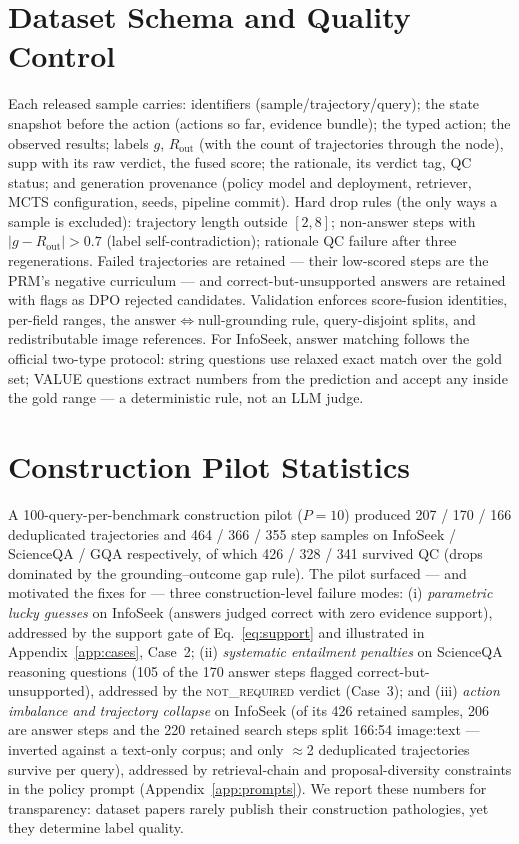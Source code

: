\documentclass[letterpaper,twocolumn,10pt]{article}
\begin{document}
\section{Dataset Schema and Quality Control}
\label{app:dataset}
Each released sample carries: identifiers (sample/trajectory/query); the
state snapshot before the action (actions so far, evidence bundle); the
typed action; the observed results; labels $g$, $R_\mathrm{out}$ (with the
count of trajectories through the node), $\mathrm{supp}$ with its raw
verdict, the fused score; the rationale, its verdict tag, QC status; and
generation provenance (policy model and deployment, retriever, MCTS
configuration, seeds, pipeline commit). Hard drop rules (the only ways a
sample is excluded): trajectory length outside $[2, 8]$; non-answer steps
with $|g - R_\mathrm{out}| > 0.7$ (label self-contradiction); rationale QC
failure after three regenerations. Failed trajectories are retained ---
their low-scored steps are the PRM's negative curriculum --- and
correct-but-unsupported answers are retained with flags as DPO rejected
candidates. Validation enforces score-fusion identities, per-field ranges,
the answer$\Leftrightarrow$null-grounding rule, query-disjoint splits, and
redistributable image references. For InfoSeek, answer matching follows
the official two-type protocol: string questions use relaxed exact match
over the gold set; VALUE questions extract numbers from the prediction and
accept any inside the gold range --- a deterministic rule, not an LLM
judge.

\section{Construction Pilot Statistics}
\label{app:pilot}
A 100-query-per-benchmark construction pilot ($P{=}10$) produced 207 / 170
/ 166 deduplicated trajectories and 464 / 366 / 355 step samples on
InfoSeek / ScienceQA / GQA respectively, of which 426 / 328 / 341 survived
QC (drops dominated by the grounding--outcome gap rule). The pilot
surfaced --- and motivated the fixes for --- three construction-level
failure modes: (i) \emph{parametric lucky guesses} on InfoSeek (answers
judged correct with zero evidence support), addressed by the support gate
of Eq.~\eqref{eq:support} and illustrated in Appendix~\ref{app:cases},
Case~2; (ii) \emph{systematic entailment penalties} on ScienceQA reasoning
questions (105 of the 170 answer steps flagged correct-but-unsupported),
addressed by the \textsc{not\_required} verdict (Case~3); and (iii)
\emph{action imbalance and trajectory collapse} on InfoSeek (of its 426
retained samples, 206 are answer steps and the 220 retained search steps
split 166:54 image:text --- inverted against a text-only corpus; and only
$\approx$2 deduplicated trajectories survive per query), addressed by retrieval-chain and
proposal-diversity constraints in the policy prompt
(Appendix~\ref{app:prompts}). We report these numbers for transparency:
dataset papers rarely publish their construction pathologies, yet they
determine label quality.
\end{document}
